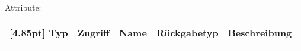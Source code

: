            Attribute:
            \begin{center}
            	\renewcommand{\arraystretch}{1.5}
	            \setlength\tabcolsep{5pt}
            	\begin{tabularx}{\textwidth}{|l|l|l|l|X|}
            		\hline
                    \rowcolor[gray]{0.75}[4.85pt]            		
            	    Typ & Zugriff & Name & Rückgabetyp & Beschreibung \\ \hline 
            	   	&&&&\\
            		\hline
            	\end{tabularx}
            \end{center}
%            
%        
%                    
%        
%        
        